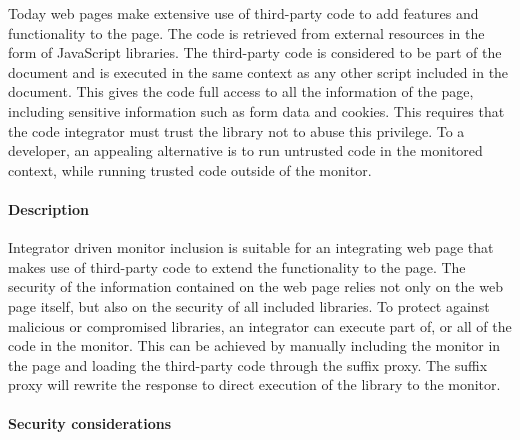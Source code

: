 \documentclass{llncs}
\begin{document}

Today web pages make extensive use of third-party code to add features 
and functionality to the page. The code is retrieved from external resources in 
the form of JavaScript libraries. The third-party code is considered to be part 
of the document and is executed in the same context as any other script 
included in the document. This gives the code full access to all the information 
of the page, including sensitive information such as form data and cookies. 
This requires that the code integrator must 
trust the library not to abuse this privilege. To a developer, an appealing alternative 
is to run untrusted code in the monitored context, while running trusted code outside of the 
monitor. 

\paragraph{Description}
Integrator driven monitor inclusion is suitable for an integrating web page 
that makes use of third-party code to extend the 
functionality to the page. The security of the information contained on the web 
page relies not only on the web page itself, but also on the security of all 
included libraries. To protect against malicious or compromised libraries, 
an integrator can execute part of, or all of the code in the monitor.
This can be achieved by manually including the monitor in the page and loading the 
third-party code through the suffix proxy. The suffix proxy will rewrite the 
response to direct execution of the library to the monitor. 

\paragraph{Security considerations}
\end{document}
